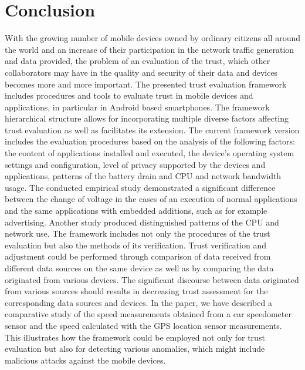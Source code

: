 \section{Conclusion}
With the growing number of mobile devices owned by ordinary citizens all around the world and an increase of their participation in the network traffic generation and data provided, the problem of an evaluation of the trust, which other collaborators may have in the quality and security of their data and devices becomes more and more important. The presented trust evaluation framework includes procedures and tools to evaluate trust in mobile devices and applications, in particular in Android based smartphones. The framework hierarchical structure allows for incorporating multiple diverse factors affecting trust evaluation as well as facilitates its extension.
The current framework version includes the evaluation procedures based on the analysis of the following factors: the content of applications installed and executed, the device’s operating system settings and configuration, level of privacy supported by the devices and applications, patterns of the battery drain and CPU and network bandwidth usage. The conducted empirical study demonstrated a significant difference between the change of voltage in the cases of an execution of normal applications and the same applications with embedded additions, such as for example advertising. Another study produced distinguished patterns of the CPU and network use.
The framework includes not only the procedures of the trust evaluation but also the methods of its verification. 
Trust verification and adjustment could be performed through comparison of data received from different data sources on the 
same device as well as by comparing the data originated from various devices. The significant discourse between data 
originated from various sources should results in decreasing trust assessment for the corresponding data sources and devices. 
In the paper, we have described a comparative study of the speed measurements obtained from a car speedometer sensor and the speed calculated 
with the GPS location sensor measurements. This illustrates how the framework could be employed not only for trust evaluation 
but also for detecting various anomalies, which might include malicious attacks against the mobile devices.
